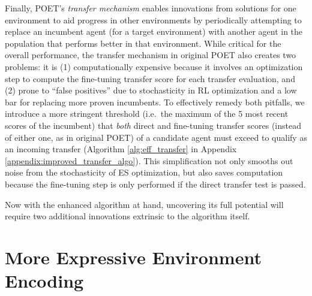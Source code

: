 \documentclass{article}
\begin{document}
Finally, POET's \emph{transfer mechanism} enables innovations from solutions for one environment to aid progress in other environments by periodically attempting to replace an incumbent agent (for a target environment) with another agent in the population that performs better in that environment. While critical for the overall performance, the transfer mechanism in original POET also creates two problems: it is (1) computationally expensive because it involves an optimization step to compute the fine-tuning transfer score for each transfer evaluation, and (2) prone to ``false positives'' due to stochasticity in RL optimization and a low bar for replacing more proven incumbents. To effectively remedy both pitfalls, we introduce a more stringent threshold (i.e.\ the maximum of the 5 most recent scores of the incumbent) that \emph{both} direct and fine-tuning transfer scores (instead of either one, as in original POET) of a candidate agent must exceed to qualify as an incoming transfer (Algorithm \ref{alg:eff_transfer} in Appendix \ref{appendix:improved_transfer_algo}). This simplification not only smooths out noise from the stochasticity of ES optimization, but also saves computation because the fine-tuning step is only performed if the direct transfer test is passed. 

Now with the enhanced algorithm at hand, uncovering its full potential will require two additional innovations
extrinsic to the algorithm itself.

\section{More Expressive Environment Encoding}
\label{subsec:ee}
\end{document}
